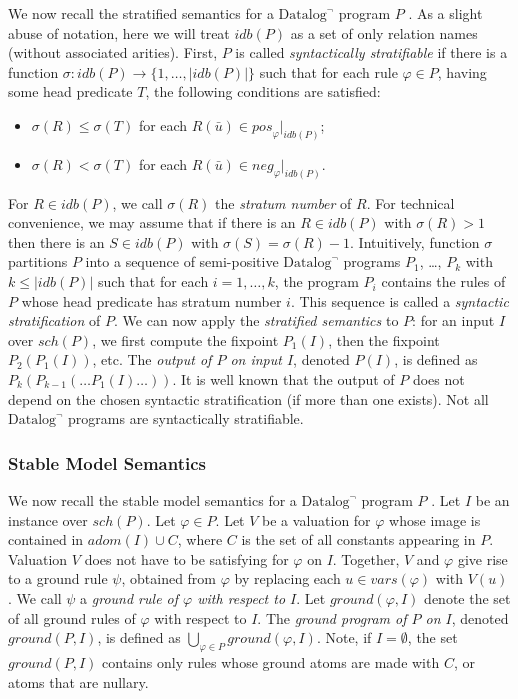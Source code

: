 \documentclass{tlp}
\newcommand{\langname}[1]{\text{#1}}  \newcommand{\pred}[1]{\mathtt{#1}}  \newcommand{\fname}[1]{\mathit{#1}}  \newcommand{\sq}[1]{`{#1}'}
\newcommand{\datalogneg}{\langname{Datalog}^{\neg}}
\newcommand{\proj}[2]{#1|_{#2}}
\newcommand{\adom}[1]{\fname{adom}(#1)}
\newcommand{\rl}{\varphi}
\newcommand{\bpos}[1]{\fname{pos}_{#1}}
\newcommand{\bneg}[1]{\fname{neg}_{#1}}
\newcommand{\idb}[1]{\fname{idb}(#1)}
\newcommand{\schof}[1]{\fname{sch}(#1)}
\newcommand{\vars}[1]{\fname{vars}(#1)}
\newcommand{\grl}{\psi}
\newcommand{\gr}[2]{\fname{ground}(#1,#2)}
\begin{document}
We now recall the stratified semantics for a $\datalogneg$ program
$P$ \cite{ahv_book}. As a slight abuse of notation, here we will
treat $\idb P$ as a set of only relation names (without associated
arities). First, $P$ is called \emph{syntactically stratifiable}
if there is a function $\sigma:\idb P\to\{1,\ldots,|\idb P|\}$ such
that for each rule $\rl\in P$, having some head predicate $T$, the
following conditions are satisfied:
\begin{itemize}
\item $\sigma(R)\leq\sigma(T)$ for each $R(\bar{u})\in\proj{\bpos{\rl}}{\idb P}$;
\item $\sigma(R)<\sigma(T)$ for each $R(\bar{u})\in\proj{\bneg{\rl}}{\idb P}$.
\end{itemize}
For $R\in\idb P$, we call $\sigma(R)$ the \emph{stratum number}
of $R$. For technical convenience, we may assume that if there is
an $R\in\idb P$ with $\sigma(R)>1$ then there is an $S\in\idb P$
with $\sigma(S)=\sigma(R)-1$. Intuitively, function $\sigma$ partitions
$P$ into a sequence of semi-positive $\datalogneg$ programs $P_{1}$,
\ldots, $P_{k}$ with $k\leq|\idb P|$ such that for each $i=1,\ldots,k$,
the program $P_{i}$ contains the rules of $P$ whose head predicate
has stratum number $i$. This sequence is called a \emph{syntactic
stratification} of $P$. We can now apply the \emph{stratified semantics}
to $P$: for an input $I$ over $\schof P$, we first compute the
fixpoint $P_{1}(I)$, then the fixpoint $P_{2}(P_{1}(I))$, etc. The
\emph{output of $P$ on input $I$}, denoted $P(I)$, is defined
as $P_{k}(P_{k-1}(\ldots P_{1}(I)\ldots))$. It is well known that
the output of $P$ does not depend on the chosen syntactic stratification
(if more than one exists). Not all $\datalogneg$ programs are syntactically
stratifiable.


\subsubsection{Stable Model Semantics}

\label{sub:stable-model-semantics}

We now recall the stable model semantics for a $\datalogneg$ program
$P$ \cite{gelfond_stable,sz_nondet}. Let $I$ be an instance over
$\schof P$. Let $\rl\in P$. Let $V$ be a valuation for $\rl$ whose
image is contained in $\adom I\cup C$, where $C$ is the set of all
constants appearing in $P$. Valuation $V$ does not have to be satisfying
for $\rl$ on $I$. Together, $V$ and $\rl$ give rise to a ground
rule $\grl$, obtained from $\rl$ by replacing each $u\in\vars{\rl}$
with $V(u)$. We call $\grl$ a \emph{ground rule of $\rl$ with
respect to $I$}. Let $\gr{\rl}I$ denote the set of all ground rules
of $\rl$ with respect to $I$. The \emph{ground program of $P$
on $I$}, denoted $\gr PI$, is defined as $\bigcup_{\rl\in P}\gr{\rl}I$.
Note, if $I=\emptyset$, the set $\gr PI$ contains only rules whose
ground atoms are made with $C$, or atoms that are nullary.
\end{document}
